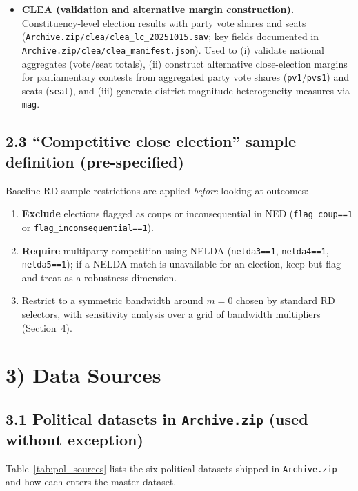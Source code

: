 \documentclass[11pt]{article}
\newcommand{\1}{\mathbf{1}}
\begin{document}
\begin{itemize}[leftmargin=1.2em]
\item \textbf{CLEA (validation and alternative margin construction).} Constituency-level election results with party vote shares and seats (\texttt{Archive.zip/clea/clea\_lc\_20251015.sav}; key fields documented in \texttt{Archive.zip/clea/clea\_manifest.json}). Used to (i) validate national aggregates (vote/seat totals), (ii) construct alternative close-election margins for parliamentary contests from aggregated party vote shares (\texttt{pv1}/\texttt{pvs1}) and seats (\texttt{seat}), and (iii) generate district-magnitude heterogeneity measures via \texttt{mag}.
\end{itemize}

\subsection*{2.3 ``Competitive close election'' sample definition (pre-specified)}
Baseline RD sample restrictions are applied \emph{before} looking at outcomes:
\begin{enumerate}[leftmargin=1.2em]
\item \textbf{Exclude} elections flagged as coups or inconsequential in NED (\texttt{flag\_coup==1} or \texttt{flag\_inconsequential==1}).
\item \textbf{Require} multiparty competition using NELDA (\texttt{nelda3==1}, \texttt{nelda4==1}, \texttt{nelda5==1}); if a NELDA match is unavailable for an election, keep but flag and treat as a robustness dimension.
\item Restrict to a symmetric bandwidth around $m=0$ chosen by standard RD selectors, with sensitivity analysis over a grid of bandwidth multipliers (Section~4).
\end{enumerate}

\section*{3) Data Sources}

\subsection*{3.1 Political datasets in \texttt{Archive.zip} (used without exception)}
Table~\ref{tab:pol_sources} lists the six political datasets shipped in \texttt{Archive.zip} and how each enters the master dataset.
\end{document}
